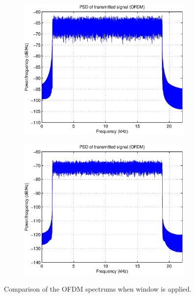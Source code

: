 \documentclass[12pt,a4paper,openright]{report}
\begin{document}
	 \begin{figure}[H]
	 \centering
	\begin{subfigure}[h]{0.49\textwidth}
	 \centering
	    \includegraphics[width=0.95\textwidth]{ofdmnowindow.eps}
	    \label{fig:ofdmnowin1}	
	\end{subfigure}
	\begin{subfigure}[H]{0.49\textwidth}
	 \centering
	    \includegraphics[width=0.95\textwidth]{ofdmwindow.eps}
	    \label{fig:ofdmwin2}
	    \end{subfigure}
	    \caption[OFDM windowing]{Comparison of the OFDM spectrums when window is applied.}
	    \label{fig:ofdmnowinT}	
	    
	    \end{figure}
\end{document}
